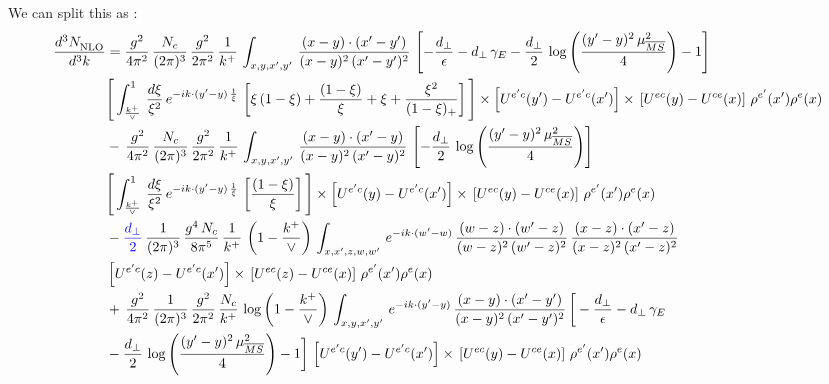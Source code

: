 \documentclass[10pt]{article}
\newcommand{\new}[1]{{\color{blue}#1}}
\begin{document}
We can split this as :  \begin{align}
    \frac{d^{3}N_{\rm NLO}^{\rm}}{d^{3}k}  & =  \frac{g^{2}}{4\pi^{2}}\, \frac{N_{c}}{(2\pi)^{3}}\,\frac{g^{2}}{2\pi^{2}}\, \frac{1}{k^{+}}\,\int_{x,y,x',y'}\,\frac{(x-y)\cdot (x'-y')}{(x-y)^{2}\,(x'-y')^{2}}\,\left[-\frac{d_{\perp}}{\epsilon}-d_{\perp}\,\gamma_{E}-\frac{d_{\perp}}{2}\,\log{\left(\frac{(y'-y)^{2}\,\mu^{2}_{\overline{MS}}}{4}\right)}-1\right]\,\notag \\ & \Bigg[\int_{\frac{k^{+}}{\vee}}^{1}\,\frac{d\xi}{\xi^{2}}\,e^{-ik\cdot (y'-y)\,\frac{1}{\xi}}\,\left[\xi\,(1-\xi)+\frac{(1-\xi)}{\xi}+\xi+\frac{\xi^{2}}{(1-\xi)_{+}}\right]\Bigg]\times \left[U^{e'c}(y') - U^{e'c}(x')\right] \times\, \left[U^{ec}(y) - U^{ce}(x)\right]\, \rho^{e'}(x') \rho^{e}(x) \notag \\
&   -\,\frac{g^{2}}{4\pi^{2}}\, \frac{N_{c}}{(2\pi)^{3}}\,\frac{g^{2}}{2\pi^{2}}\, \frac{1}{k^{+}}\,\int_{x,y,x',y'}\,\frac{(x-y)\cdot (x'-y)}{(x-y)^{2}\,(x'-y)^{2}}\,\left[-\frac{d_{\perp}}{2}\,\log{\left(\frac{(y'-y)^{2}\,\mu^{2}_{\overline{MS}}}{4}\right)}\right]\,\notag \\ &  \Bigg[\int_{\frac{k^{+}}{\vee}}^{1}\,\frac{d\xi}{\xi^{2}}\,e^{-ik\cdot (y'-y)\,\frac{1}{\xi}}\,\left[\frac{(1-\xi)}{\xi}\right]\Bigg]\times \left[U^{e'c}(y) - U^{e'c}(x')\right] \times\, \left[U^{ec}(y) - U^{ce}(x)\right]\, \rho^{e'}(x') \rho^{e}(x) \notag \\
&   -\new{\frac{d_{\perp}}{2}}\,\frac{1}{(2\pi)^{3}}\,\frac{g^{4}\,N_{c}}{8\pi^{5}}\,\frac{1}{k^{+}}\,\left(1-\frac{k^{+}}{\vee}\right)\,\int_{x,x',z,w,w'}\,e^{-ik\cdot (w'-w)}\,\frac{(w-z)\cdot(w'-z)}{(w-z)^{2}\,(w'-z)^{2}}\,\frac{(x-z)\cdot(x'-z)}{(x-z)^{2}\,(x'-z)^{2}}\notag \\
& \left[U^{e'c}(z) - U^{e'c}(x')\right] \times\, \left[U^{ec}(z) - U^{ce}(x)\right]\, \rho^{e'}(x') \rho^{e}(x) \notag \\
&  +\, \frac{g^{2}}{4\pi^{2}}\, \frac{1}{(2\pi)^{3}}\,\frac{g^{2}}{2\pi^{2}}\, \frac{N_{c}}{k^{+}}\,\log{\left(1-\frac{k^{+}}{\vee}\right)}\,\int_{x,y,x',y'}\,e^{-ik\cdot (y'-y)}\,\frac{(x-y)\cdot (x'-y')}{(x-y)^{2}\,(x'-y')^{2}}\,\bigg[-\frac{d_{\perp}}{\epsilon}-d_{\perp}\,\gamma_{E}\notag \\ & -\frac{d_{\perp}}{2}\,\log{\left(\frac{(y'-y)^{2}\,\mu^{2}_{\overline{MS}}}{4}\right)}-1\bigg]\,\left[U^{e'c}(y') - U^{e'c}(x')\right] \times\, \left[U^{ec}(y) - U^{ce}(x)\right]\, \rho^{e'}(x') \rho^{e}(x) \notag \\

\end{align}
\end{document}
